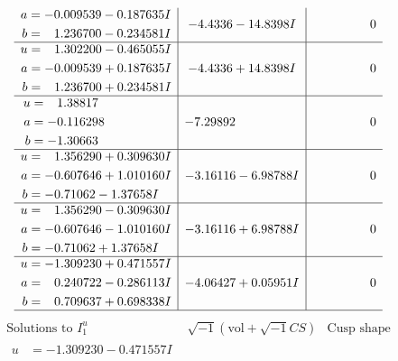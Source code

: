 \documentclass[1p]{elsarticle_modified}
\theoremstyle{definition}
\newcommand{\I}{\sqrt{-1}}
\begin{document}
$$\begin{array}{c|c|c}
\begin{aligned}
a &= -0.009539 - 0.187635 I \\
b &= \phantom{-}1.236700 - 0.234581 I\end{aligned}
 & -4.4336 - 14.8398 I & \phantom{-0.000000 } 0 \\ \hline\begin{aligned}
u &= \phantom{-}1.302200 - 0.465055 I \\
a &= -0.009539 + 0.187635 I \\
b &= \phantom{-}1.236700 + 0.234581 I\end{aligned}
 & -4.4336 + 14.8398 I & \phantom{-0.000000 } 0 \\ \hline\begin{aligned}
u &= \phantom{-}1.38817\phantom{ +0.000000I} \\
a &= -0.116298\phantom{ +0.000000I} \\
b &= -1.30663\phantom{ +0.000000I}\end{aligned}
 & -7.29892\phantom{ +0.000000I} & \phantom{-0.000000 } 0 \\ \hline\begin{aligned}
u &= \phantom{-}1.356290 + 0.309630 I \\
a &= -0.607646 + 1.010160 I \\
b &= -0.71062 - 1.37658 I\end{aligned}
 & -3.16116 - 6.98788 I & \phantom{-0.000000 } 0 \\ \hline\begin{aligned}
u &= \phantom{-}1.356290 - 0.309630 I \\
a &= -0.607646 - 1.010160 I \\
b &= -0.71062 + 1.37658 I\end{aligned}
 & -3.16116 + 6.98788 I & \phantom{-0.000000 } 0 \\ \hline\begin{aligned}
u &= -1.309230 + 0.471557 I \\
a &= \phantom{-}0.240722 - 0.286113 I \\
b &= \phantom{-}0.709637 + 0.698338 I\end{aligned}
 & -4.06427 + 0.05951 I & \phantom{-0.000000 } 0\\
 \hline 
 \end{array}$$\newpage$$\begin{array}{c|c|c}  
\text{Solutions to }I^u_{1}& \I (\text{vol} + \sqrt{-1}CS) & \text{Cusp shape}\\
 \hline 
\begin{aligned}
u &= -1.309230 - 0.471557 I \\

\end{aligned}
\end{array}$$
\end{document}
